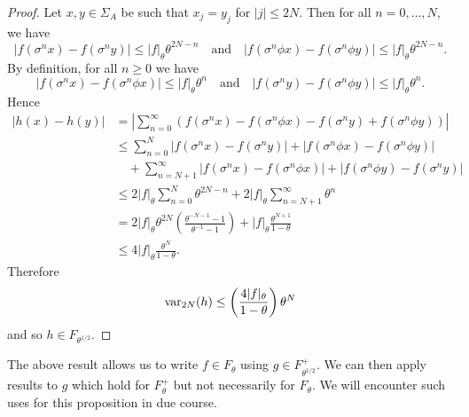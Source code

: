 \begin{proposition}
\begin{proof}
		Let $x, y \in \Sigma_A$ be such that $x_j = y_j$ for $|j| \leq 2N$. Then for all $n = 0, \dots, N$, we have
		\[
			|f(\sigma^n{x}) - f(\sigma^n{y})| \leq |f|_\theta \theta^{2N - n} \quad \text{and} \quad |f(\sigma^n \phi{x}) - f(\sigma^n \phi{y})| \leq |f|_\theta \theta^{2N - n}.
		\]
		By definition, for all $n \geq 0$ we have
		\[
			|f(\sigma^n{x}) - f(\sigma^n \phi{x})| \leq |f|_\theta \theta^n \quad \text{and} \quad |f(\sigma^n {y}) - f(\sigma^n \phi{y})| \leq |f|_\theta \theta^n.
		\]
		Hence
		\begin{align*}
			|h(x) - h(y)| &= \left|\sum_{n = 0}^\infty{\left(f(\sigma^n{x}) - f(\sigma^n \phi{x}) - f(\sigma^n{y}) + f(\sigma^n \phi{y})\right)}\right| \\
				&\leq \sum_{n = 0}^N{|f(\sigma^n{x}) - f(\sigma^n{y})| + | f(\sigma^n \phi{x}) -  f(\sigma^n \phi{y})|} \\
				&\quad + \sum_{n = N + 1}^\infty{|f(\sigma^n{x}) - f(\sigma^n \phi{x})| + | f(\sigma^n \phi{y}) -  f(\sigma^n {y})|} \\
				&\leq 2|f|_\theta \sum_{n = 0}^N{\theta^{2N - n}} + 2|f|_\theta \sum_{n = N + 1}^\infty{\theta^n} \\
				&= 2|f|_\theta \theta^{2N} \left(\frac{\theta^{-N - 1} - 1}{\theta^{-1} - 1}\right) + |f|_\theta \frac{\theta^{N + 1}}{1 - \theta} \\
				&\leq 4|f|_\theta \frac{\theta^N}{1 - \theta}.
		\end{align*}
		Therefore
		\[
			\operatorname{var}_{2N}(h) \leq \left(\frac{4|f|_\theta}{1 - \theta}\right)\theta^N
		\]
		and so $h \in F_{\theta^{1 / 2}}$.
	\end{proof}
\end{proposition}

The above result allows us to write $f \in F_\theta$ using $g \in F_{\theta^{1 / 2}}^+$. We can then apply results to $g$ which hold for $F_\theta^+$ but not necessarily for $F_\theta$. We will encounter such uses for this proposition in due course.
